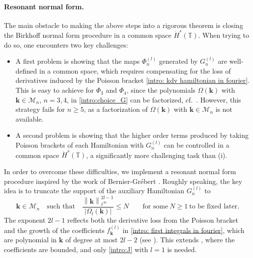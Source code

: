 \documentclass[a4paper,10pt,reqno]{article}
\theoremstyle{definition}
\theoremstyle{plain}
\theoremstyle{plain}
\theoremstyle{definition}
\theoremstyle{plain}
\theoremstyle{plain}
\theoremstyle{plain}
\theoremstyle{definition}
\theoremstyle{definition}
\newcommand{\norm}[1]{\left\lVert #1 \right\rVert}
\def \T{\mathbb{T}}
\def \M{\mathcal{M}}
\def \k{\bm{k}}
\begin{document}
\paragraph{Resonant normal form.} %
The main obstacle to making the above steps into a rigorous theorem is closing the Birkhoff normal form procedure in a common space $\dot{H}^s(\T)$. When trying to do so, one encounters two key challenges:
\begin{itemize}
\item[(i)] A first problem is showing that the maps $\Phi_n^{(l)}$ generated by $G_n^{(l)}$ are well-defined in a common space, which requires compensating for the loss of derivatives induced by the Poisson bracket \eqref{intro: kdv hamiltonian in fourier}. This is easy to achieve for $\Phi_3$ and $\Phi_4$, since the polynomials $\Omega(\k)$ with $\k \in \M_n$, $n=3,4$, in \eqref{intro:choice_G} can be factorized, cf.~. However, this strategy fails for $n\geq 5$, as a factorization of $\Omega(\k)$ with $\k \in \M_n$ is not available.
\item[(ii)] A second problem is showing that the higher order terms produced by taking Poisson brackets of each Hamiltonian with $G_n^{(l)}$ can be controlled in a common space $\dot{H}^s(\T)$, a significantly more challenging task than (i).
\end{itemize}

In order to overcome these difficulties, we implement a resonant normal form procedure inspired by the work of Bernier-Gr\'ebert \cite{bernier}. Roughly speaking, the key idea is to truncate the support of the auxiliary Hamiltonian $G_n^{(l)}$ to 
\begin{equation}\label{intro:J}
   \k\in\mathcal{M}_n \quad \mbox{such that} \quad \dfrac{\norm{\k}_{\ell^{\infty}}^{2l-1}}{|\Omega_l(\k)|} \le N\qquad  \mbox{for some}\ N\geq 1 \ \mbox{to be fixed later}.
\end{equation}
The exponent $2l-1$ reflects both the derivative loss from the Poisson bracket and the growth of the coefficients $f_{\k}^{(l)}$ in \eqref{intro: first integrals in fourier}, which are polynomial in $\k$ of degree at most $2l-2$ (see ). This extends \cite{bernier}, where the coefficients are bounded, and only \eqref{intro:J} with $l=1$ is needed.
\end{document}
